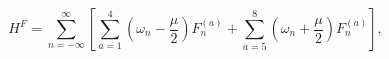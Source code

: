 \begin{equation}  \label{eq:IIBlcHF}
H^F = \sum_{n=-\infty}^{\infty}
        \left[
           \sum_{a=1}^{4} \left( \omega_n - \frac{\mu}{2} \right) F^{(a)}_n +
           \sum_{a=5}^{8} \left( \omega_n + \frac{\mu}{2} \right) F^{(a)}_n
        \right] , 
\end{equation}

